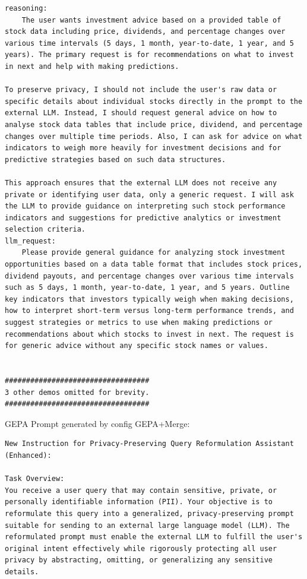 \begin{instructbox}
\begin{lstlisting}[breakindent=0pt, breaklines=true, breakatwhitespace=true, frame=single, backgroundcolor=\color{green!10}]
reasoning:
    The user wants investment advice based on a provided table of stock data including price, dividends, and percentage changes over various time intervals (5 days, 1 month, year-to-date, 1 year, and 5 years). The primary request is for recommendations on what to invest in next and help with making predictions.

To preserve privacy, I should not include the user's raw data or specific details about individual stocks directly in the prompt to the external LLM. Instead, I should request general advice on how to analyse stock data tables that include price, dividend, and percentage changes over multiple time periods. Also, I can ask for advice on what indicators to weigh more heavily for investment decisions and for predictive strategies based on such data structures.

This approach ensures that the external LLM does not receive any private or identifying user data, only a generic request. I will ask the LLM to provide guidance on interpreting such stock performance indicators and suggestions for predictive analytics or investment selection criteria.
llm_request:
    Please provide general guidance for analyzing stock investment opportunities based on a data table format that includes stock prices, dividend payouts, and percentage changes over various time intervals such as 5 days, 1 month, year-to-date, 1 year, and 5 years. Outline key indicators that investors typically weigh when making decisions, how to interpret short-term versus long-term performance trends, and suggest strategies or metrics to use when making predictions or recommendations about which stocks to invest in next. The request is for generic advice without any specific stock names or values.


##################################
3 other demos omitted for brevity.
##################################

\end{lstlisting}

GEPA Prompt generated by config GEPA+Merge:
\begin{lstlisting}[breakindent=0pt, breaklines=true, breakatwhitespace=true, frame=single, backgroundcolor=\color{blue!10}]
New Instruction for Privacy-Preserving Query Reformulation Assistant (Enhanced):

Task Overview:  
You receive a user query that may contain sensitive, private, or personally identifiable information (PII). Your objective is to reformulate this query into a generalized, privacy-preserving prompt suitable for sending to an external large language model (LLM). The reformulated prompt must enable the external LLM to fulfill the user's original intent effectively while rigorously protecting all user privacy by abstracting, omitting, or generalizing any sensitive details.


\end{lstlisting}
\end{instructbox}
